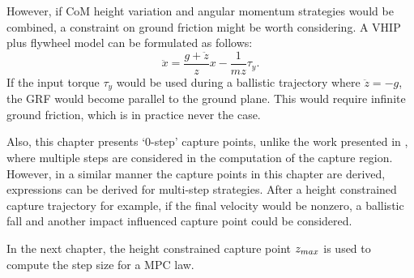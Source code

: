 However, if \ac{CoM} height variation and angular momentum strategies would be combined, a constraint on ground friction might be worth considering.  A \ac{VHIP} plus flywheel model can be formulated as follows:
\begin{equation}
 \ddot{x} = \frac{g+\ddot{z}}{z}x - \frac{1}{mz}\tau_y.
\end{equation}
If the input torque $\tau_y$ would be used during a ballistic trajectory where $\ddot{z}=-g$, the \ac{GRF} would become parallel to the ground plane. This would require infinite ground friction, which is in practice never the case.

Also, this chapter presents `0-step' capture points, unlike the work presented in \cite{koolen2012capturability}, where multiple steps are considered in the computation of the capture region. However, in a similar manner the capture points in this chapter are derived, expressions can be derived for multi-step strategies. After a height constrained capture trajectory for example, if the final velocity would be nonzero, a ballistic fall and another impact influenced capture point could be considered. 

In the next chapter, the height constrained capture point $z_{max}$ is used to compute the step size for a \ac{MPC} law.